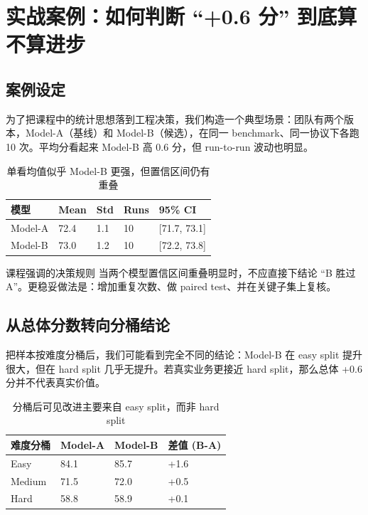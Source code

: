 \section{实战案例：如何判断 ``+0.6 分'' 到底算不算进步}

\subsection{案例设定}
为了把课程中的统计思想落到工程决策，我们构造一个典型场景：团队有两个版本，Model-A（基线）和 Model-B（候选），在同一 benchmark、同一协议下各跑 10 次。平均分看起来 Model-B 高 0.6 分，但 run-to-run 波动也明显。

\begin{table}[H]
\centering
\begin{tabular}{p{2.5cm}p{2.2cm}p{2.2cm}p{2.0cm}p{2.2cm}}
\toprule
\textbf{模型} & \textbf{Mean} & \textbf{Std} & \textbf{Runs} & \textbf{95\% CI} \\
\midrule
Model-A & 72.4 & 1.1 & 10 & [71.7, 73.1] \\
Model-B & 73.0 & 1.2 & 10 & [72.2, 73.8] \\
\bottomrule
\end{tabular}
\caption{单看均值似乎 Model-B 更强，但置信区间仍有重叠}
\end{table}

\begin{knowledgebox}{课程强调的决策规则}
当两个模型置信区间重叠明显时，不应直接下结论 ``B 胜过 A''。更稳妥做法是：增加重复次数、做 paired test、并在关键子集上复核。
\end{knowledgebox}

\subsection{从总体分数转向分桶结论}
把样本按难度分桶后，我们可能看到完全不同的结论：Model-B 在 easy split 提升很大，但在 hard split 几乎无提升。若真实业务更接近 hard split，那么总体 +0.6 分并不代表真实价值。

\begin{table}[H]
\centering
\begin{tabular}{p{2.3cm}p{2.4cm}p{2.4cm}p{2.4cm}}
\toprule
\textbf{难度分桶} & \textbf{Model-A} & \textbf{Model-B} & \textbf{差值 (B-A)} \\
\midrule
Easy & 84.1 & 85.7 & +1.6 \\
Medium & 71.5 & 72.0 & +0.5 \\
Hard & 58.8 & 58.9 & +0.1 \\
\bottomrule
\end{tabular}
\caption{分桶后可见改进主要来自 easy split，而非 hard split}
\end{table}


